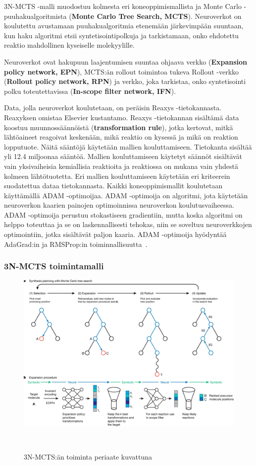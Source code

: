 \documentclass[finnish,twoside,censored,tkt,sw-line]{HYthesisML}
\begin{document}
3N-MCTS -malli muodostuu kolmesta eri koneoppimismallista ja Monte Carlo -puuhakualgoritmista (\textbf{Monte Carlo Tree Search, MCTS}).
Neuroverkot on koulutettu avustamaan puuhakualgoritmia etenemään järkevimpään suuntaan, kun haku algoritmi etsii syntetisointipolkuja ja tarkistamaan, onko ehdotettu reaktio mahdollinen kyseiselle molekyylille.

Neuroverkot ovat hakupuun laajentumisen suuntaa ohjaava verkko (\textbf{Expansion policy network, EPN}), MCTS:än rollout toimintoa tukeva Rollout -verkko (\textbf{Rollout policy network, RPN}) ja verkko, joka tarkistaa, onko syntetisointi polku toteutettavissa (\textbf{In-scope filter network, IFN}).

Data, jolla neuroverkot koulutetaan, on peräisin Reaxys -tietokannasta.
Reaxyksen omistaa Elsevier kustantamo.
Reaxys -tietokannan sisältämä data koostuu muunnossäännöistä (\textbf{transformation rule}), jotka kertovat, mitkä lähtöaineet reagoivat keskenään, mikä reaktio on kysessä ja mikä on reaktion lopputuote.
Näitä sääntöjä käytetään mallien kouluttamiseen.
Tietokanta sisältää yli 12.4 miljoonaa sääntöä.
Mallien kouluttamiseen käytetyt säännöt sisältävät vain yksivaiheisia kemiallisia reaktioita ja reaktiossa on mukana vain yhdestä kolmeen lähtötuotetta.
Eri mallien kouluttamiseen käytetään eri kriteerein suodatettua dataa tietokannasta.
Kaikki koneoppimismallit koulutetaan käyttämällä ADAM -optimoijaa.
ADAM -optimoija on algoritmi, jota käytetään neuroverkon kaarien painojen optimoinnissa neuroverkon koulutusvaiheessa.
ADAM -optimoija perustuu stokastiseen gradientiin, mutta koska algoritmi on helppo toteuttaa ja se on laskennallisesti tehokas, niin se soveltuu neuroverkkojen optimointiin, jotka sisältävät paljon kaaria.
ADAM -optimoija hyödyntää AdaGrad:in ja RMSProp:in toiminnallisuutta~\cite{kingma2017adam}.

\subsubsection{3N-MCTS toimintamalli}

\begin{figure}[ht]
    \centering
    \includegraphics[width=\textwidth]{3N-MCTS-fig.jpg}
    \caption{3N-MCTS:än toiminta periaate kuvattuna}
    {~\cite{SeglerMarwinHS2018Pcsw}}
\end{figure}
\end{document}
